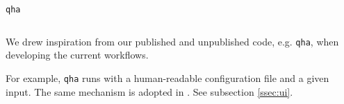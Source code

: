 \begin{frame}{\texttt{qha}}
    \begin{columns}[t]
        \begin{column}{0.4\textwidth}
            We drew inspiration from our published and unpublished code, e.g. \texttt{qha},
            when developing the current workflows.

            For example, \texttt{qha} runs with a human-readable
            configuration file and a given input.
            The same mechanism is adopted in \express{}.
            See subsection \ref{ssec:ui}.
        \end{column}

        \begin{column}{0.6\textwidth}
        \end{column}
    \end{columns}

\end{frame}
